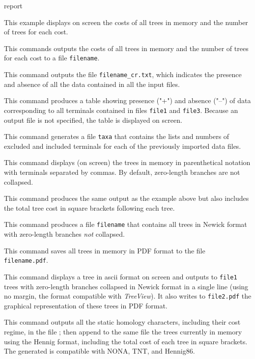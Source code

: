 \begin{command}{report}{}
\begin{poyexamples}
{This example displays on screen the costs of all trees in memory and the
number of trees for each cost.}

{This commands outputs the costs of all trees in memory and the
number of trees for each cost to a file \texttt{filename}.}

{This command outputs the file \texttt{filename\_cr.txt}, which indicates 
the presence and absence of all the data contained in all the input files.}

{This command produces a table showing presence ("+")
and absence ("--") of data corresponding to all terminals contained
in files \texttt{file1} and \texttt{file3}. Because an output
file is not specified, the table is displayed on screen.}

{This command generates a file \texttt{taxa} that contains the
lists and numbers of excluded and included terminals for each of the previously
imported data files.}

{This command displays (on screen) the trees in memory in parenthetical
notation with terminals separated by commas. By default, zero-length branches 
are not collapsed.}

{This command produces the same output as the example above
but also includes the total tree cost in square brackets
following each tree.}

{This command produces a file \texttt{filename} that contains
all trees in Newick format with zero-length branches \emph{not}
collapsed.}

{This command saves all trees in memory in
PDF format to the file \texttt{filename.pdf}.}

{This command displays a tree in ascii format on screen and outputs
to \texttt{file1} trees with zero-length branches collapsed in Newick format
in a single line (using no margin, the format compatible with \emph{TreeView}). It
also writes to \texttt{file2.pdf} the graphical representation of these trees in
PDF format.}

{This command outputs all the static homology characters, including their cost
regime, in the file ; then append to the same
file the trees currently in memory using the Hennig format, 
including the total cost of each tree in square brackets. The
generated  is compatible with NONA, TNT, and
Hennig86.
 }


\end{poyexamples}
\end{command}
